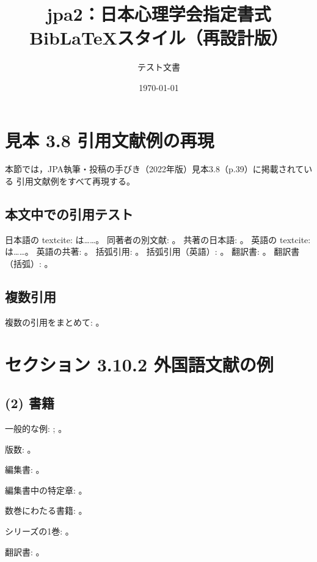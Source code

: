\documentclass[a4paper]{jlreq}
\title{jpa2：日本心理学会指定書式\\[.5\zh]Bib{\LaTeX}スタイル（再設計版）}
\author{テスト文書}
\date{\today}
\begin{document}
\maketitle

\section{見本 3.8 引用文献例の再現}

本節では，JPA執筆・投稿の手びき（2022年版）見本3.8（p.39）に掲載されている
引用文献例をすべて再現する。

\subsection{本文中での引用テスト}

日本語の textcite: \textcite{Fukaya2011a}は……。
同著者の別文献: \textcite{Fukaya2011b}。
共著の日本語: \textcite{Hayashi2015}。
英語の textcite: \textcite{Ishii2011a}は……。
英語の共著: \textcite{Ishii2017}。
括弧引用: \parencite{Sugiura2003}。
括弧引用（英語）: \parencite{Christie2011}。
翻訳書: \textcite{Whiston2013ja}。
翻訳書（括弧）: \parencite{Whiston2013ja}。

\subsection{複数引用}

複数の引用をまとめて:
\parencite{Fukaya2011a,Ishii2011a,Kaminose2017}。

\section{セクション 3.10.2 外国語文献の例}

\subsection{(2) 書籍}

一般的な例: \textcite{Christie2011}; \textcite{Rosen2015}。

版数: \textcite{APA2013}。

編集書: \textcite{Osaka2007}。

編集書中の特定章: \textcite{Morioka2018}。

数巻にわたる書籍: \textcite{Freud1956}。

シリーズの1巻: \textcite{Lamb2015}。

翻訳書: \textcite{Helmholtz1925}。
\end{document}
